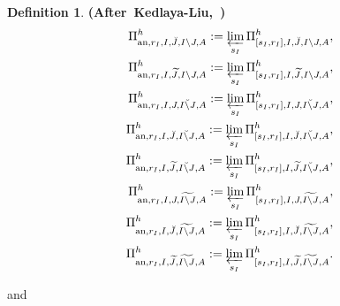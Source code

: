 \documentclass[12pt]{amsart}
\theoremstyle{definition}
\newtheorem{definition}[theorem]{Definition}
\numberwithin{equation}{section}
\begin{document}
\begin{definition} \mbox{\bf{(After Kedlaya-Liu, \cite[Definition 5.2.1]{KL2})}}
\begin{align}
\Pi^h_{\mathrm{an},r_I,I,\breve{J},I\backslash J,A}:=\varprojlim_{s_I}\Pi^h_{[s_I,r_I],I,\breve{J},I\backslash J,A},\\	
\Pi^h_{\mathrm{an},r_I,I,\widetilde{J},I\backslash J,A}:=\varprojlim_{s_I} \Pi^h_{[s_I,r_I],I,\widetilde{J},I\backslash J,A},\\
\Pi^h_{\mathrm{an},r_I,I,J,\breve{I\backslash J},A}:=\varprojlim_{s_I}\Pi^h_{[s_I,r_I],I,J,\breve{I\backslash J},A},\\	
\Pi^h_{\mathrm{an},r_I,I,\breve{J},\breve{I\backslash J},A}:=\varprojlim_{s_I} \Pi^h_{[s_I,r_I],I,\breve{J},\breve{I\backslash J},A},\\	
\Pi^h_{\mathrm{an},r_I,I,\widetilde{J},\breve{I\backslash J},A}:=\varprojlim_{s_I} \Pi^h_{[s_I,r_I],I,\widetilde{J},\breve{I\backslash J},A},\\
\Pi^h_{\mathrm{an},r_I,I,J,\widetilde{I\backslash J},A}:=\varprojlim_{s_I} \Pi^h_{[s_I,r_I],I,J,\widetilde{I\backslash J},A},\\	
\Pi^h_{\mathrm{an},r_I,I,\breve{J},\widetilde{I\backslash J},A}:=\varprojlim_{s_I} \Pi^h_{[s_I,r_I],I,\breve{J},\widetilde{I\backslash J},A},\\	
\Pi^h_{\mathrm{an},r_I,I,\widetilde{J},\widetilde{I\backslash J},A}:=\varprojlim_{s_I} \Pi^h_{[s_I,r_I],I,\widetilde{J},\widetilde{I\backslash J},A}.	
\end{align}

and 


\end{definition}
\end{document}
